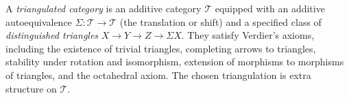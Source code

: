 
A \emph{triangulated category} is an additive category $\mathcal T$ equipped with an additive autoequivalence $\Sigma:\mathcal T\to\mathcal T$ (the translation or shift) and a specified class of \emph{distinguished triangles} $X\to Y\to Z\to\Sigma X$. They satisfy Verdier's axioms, including the existence of trivial triangles, completing arrows to triangles, stability under rotation and isomorphism, extension of morphisms to morphisms of triangles, and the octahedral axiom. The chosen triangulation is extra structure on $\mathcal T$.
